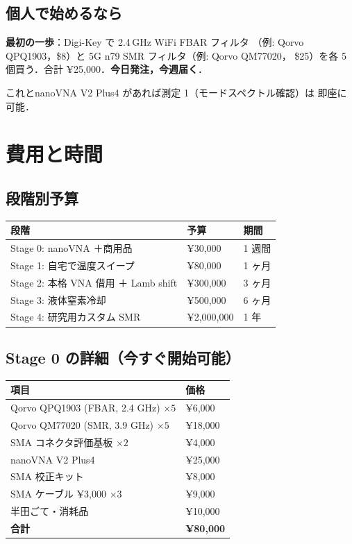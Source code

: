 \documentclass[11pt,a4paper]{article}
\begin{document}
\subsection{個人で始めるなら}

\textbf{最初の一歩}：Digi-Key で 2.4\,GHz WiFi FBAR フィルタ
（例: Qorvo QPQ1903，\$8）と 5G n79 SMR フィルタ（例: Qorvo QM77020，
\$25）を各 5 個買う．合計 ¥25,000．\textbf{今日発注，今週届く}．

これとnanoVNA V2 Plus4 があれば測定 1（モードスペクトル確認）は
即座に可能．

\section{費用と時間}

\subsection{段階別予算}

\begin{center}
\begin{tabular}{lll}
\toprule
段階 & 予算 & 期間 \\
\midrule
Stage 0: nanoVNA ＋商用品 & ¥30,000 & 1 週間 \\
Stage 1: 自宅で温度スイープ & ¥80,000 & 1 ヶ月 \\
Stage 2: 本格 VNA 借用 ＋ Lamb shift & ¥300,000 & 3 ヶ月 \\
Stage 3: 液体窒素冷却 & ¥500,000 & 6 ヶ月 \\
Stage 4: 研究用カスタム SMR & ¥2,000,000 & 1 年 \\
\bottomrule
\end{tabular}
\end{center}

\subsection{Stage 0 の詳細（今すぐ開始可能）}

\begin{center}
\begin{tabular}{ll}
\toprule
項目 & 価格 \\
\midrule
Qorvo QPQ1903 (FBAR, 2.4 GHz) $\times 5$ & ¥6,000 \\
Qorvo QM77020 (SMR, 3.9 GHz) $\times 5$ & ¥18,000 \\
SMA コネクタ評価基板 $\times 2$ & ¥4,000 \\
nanoVNA V2 Plus4 & ¥25,000 \\
SMA 校正キット & ¥8,000 \\
SMA ケーブル ¥3,000 $\times 3$ & ¥9,000 \\
半田ごて・消耗品 & ¥10,000 \\
\midrule
\textbf{合計} & \textbf{¥80,000} \\
\bottomrule
\end{tabular}
\end{center}
\end{document}
